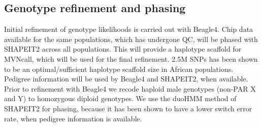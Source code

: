 \subsection{Genotype refinement and phasing}
Initial refinement of genotype likelihoods is carried out with Beagle4. Chip data available for the same populations, which has undergone QC, will be phased with SHAPEIT2 across all populations. This will provide a haplotype scaffold for MVNcall, which will be used for the final refinement. 2.5M SNPs has been shown to be an optimal/sufficient haplotype scaffold size in African populations.\cite{Menelaou2013} Pedigree information will be used by Beagle4 and SHAPEIT2, when available. Prior to refinement with Beagle4 we recode haploid male genotypes (non-PAR X and Y) to homozygous diploid genotypes. We use the duoHMM method of SHAPEIT2 for phasing, because it has been shown to have a lower switch error rate, when pedigree information is available.\cite{OConnell2014}
